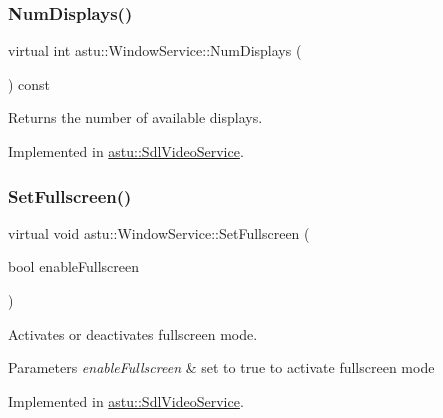 \mbox{\label{classastu_1_1WindowService_ad773e0c567946e06ace76c016bb16349}} 
\subsubsection{\texorpdfstring{Num\+Displays()}{NumDisplays()}}
{\footnotesize\ttfamily virtual int astu\+::\+Window\+Service\+::\+Num\+Displays (\begin{DoxyParamCaption}{ }\end{DoxyParamCaption}) const\hspace{0.3cm}{\ttfamily [pure virtual]}}

Returns the number of available displays. 

Implemented in \hyperlink{classastu_1_1SdlVideoService_a3aefc8ab3780a23cdef8780e42436fd5}{astu\+::\+Sdl\+Video\+Service}.

\mbox{\label{classastu_1_1WindowService_abe2ef0eb9f42078676318945e15d2dce}} 
\subsubsection{\texorpdfstring{Set\+Fullscreen()}{SetFullscreen()}}
{\footnotesize\ttfamily virtual void astu\+::\+Window\+Service\+::\+Set\+Fullscreen (\begin{DoxyParamCaption}\item[{bool}]{enable\+Fullscreen }\end{DoxyParamCaption})\hspace{0.3cm}{\ttfamily [pure virtual]}}

Activates or deactivates fullscreen mode.


\begin{DoxyParams}{Parameters}
{\em enable\+Fullscreen} & set to {\ttfamily true} to activate fullscreen mode \\
\hline
\end{DoxyParams}


Implemented in \hyperlink{classastu_1_1SdlVideoService_a45a37b4958f6e77e22ffa55699a171ef}{astu\+::\+Sdl\+Video\+Service}.


